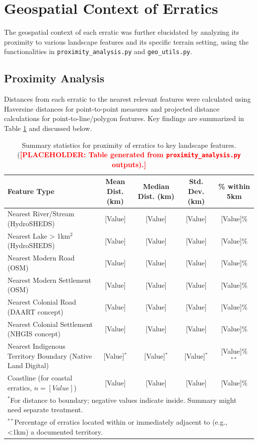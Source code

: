 \documentclass[
11pt, %
english, %
singlespacing, %
headsepline, %
]{MastersDoctoralThesis} %
\newcommand{\placeholdertext}[1]{\textcolor{red}{\textbf{[PLACEHOLDER: #1]}}}
\begin{document}
\section{Geospatial Context of Erratics}
\label{sec:geospatial_context}

The geospatial context of each erratic was further elucidated by analyzing its proximity to various landscape features and its specific terrain setting, using the functionalities in \texttt{proximity\_analysis.py} and \texttt{geo\_utils.py}.

\subsection{Proximity Analysis}
\label{subsec:proximity_analysis_results}
Distances from each erratic to the nearest relevant features were calculated using Haversine distances for point-to-point measures and projected distance calculations for point-to-line/polygon features. Key findings are summarized in Table \ref{tab:proximity_summary} and discussed below.

\begin{table}[H]
\centering
\caption{Summary statistics for proximity of erratics to key landscape features. (\placeholdertext{Table generated from \texttt{proximity\_analysis.py} outputs).}}
\label{tab:proximity_summary}
\begin{tabular}{@{}lcccc@{}}
\toprule
Feature Type & Mean Dist. (km) & Median Dist. (km) & Std. Dev. (km) & \% within 5km \\ \midrule
Nearest River/Stream (HydroSHEDS) & [Value] & [Value] & [Value] & [Value]\% \\
Nearest Lake > 1km$^2$ (HydroSHEDS) & [Value] & [Value] & [Value] & [Value]\% \\
Nearest Modern Road (OSM) & [Value] & [Value] & [Value] & [Value]\% \\
Nearest Modern Settlement (OSM) & [Value] & [Value] & [Value] & [Value]\% \\
Nearest Colonial Road (DAART concept) & [Value] & [Value] & [Value] & [Value]\% \\
Nearest Colonial Settlement (NHGIS concept) & [Value] & [Value] & [Value] & [Value]\% \\
Nearest Indigenous Territory Boundary (Native Land Digital) & [Value]$^*$ & [Value]$^*$ & [Value]$^*$ & [Value]\%$^{**}$ \\
Coastline (for coastal erratics, $n=[Value]$) & [Value] & [Value] & [Value] & [Value]\% \\
\bottomrule
\multicolumn{5}{l}{\footnotesize $^*$For distance to boundary; negative values indicate inside. Summary might need separate treatment.} \\
\multicolumn{5}{l}{\footnotesize $^{**}$Percentage of erratics located within or immediately adjacent to (e.g., <1km) a documented territory.}
\end{tabular}
\end{table}
\end{document}
